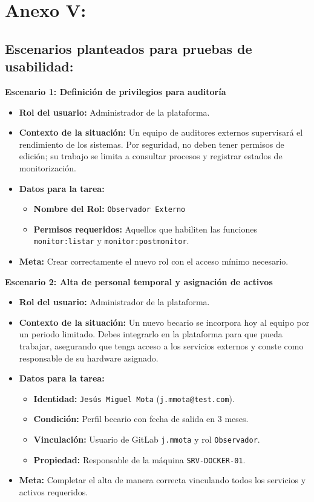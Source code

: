 \section{Anexo V:}
\subsection{Escenarios planteados para pruebas de usabilidad:}
\noindent\textbf{Escenario 1: Definición de privilegios para auditoría}
\begin{itemize}
    \item \textbf{Rol del usuario:} Administrador de la plataforma.
    \item \textbf{Contexto de la situación:} Un equipo de auditores externos supervisará el rendimiento de los sistemas. Por seguridad, no deben tener permisos de edición; su trabajo se limita a consultar procesos y registrar estados de monitorización.
    \item \textbf{Datos para la tarea:}
        \begin{itemize}
            \item \textbf{Nombre del Rol:} \texttt{Observador Externo}
            \item \textbf{Permisos requeridos:} Aquellos que habiliten las funciones \texttt{monitor:listar} y \texttt{monitor:postmonitor}.
        \end{itemize}
    \item \textbf{Meta:} Crear correctamente el nuevo rol con el acceso mínimo necesario.
\end{itemize}


\noindent\textbf{Escenario 2: Alta de personal temporal y asignación de activos}
\begin{itemize}
    \item \textbf{Rol del usuario:} Administrador de la plataforma.
    \item \textbf{Contexto de la situación:} Un nuevo becario se incorpora hoy al equipo por un periodo limitado. Debes integrarlo en la plataforma para que pueda trabajar, asegurando que tenga acceso a los servicios externos y conste como responsable de su hardware asignado.
    \item \textbf{Datos para la tarea:}
        \begin{itemize}
            \item \textbf{Identidad:} \texttt{Jesús Miguel Mota} (\texttt{j.mmota@test.com}).
            \item \textbf{Condición:} Perfil becario con fecha de salida en 3 meses.
            \item \textbf{Vinculación:} Usuario de GitLab \texttt{j.mmota} y rol \texttt{Observador}.
            \item \textbf{Propiedad:} Responsable de la máquina \texttt{SRV-DOCKER-01}.
        \end{itemize}
    \item \textbf{Meta:} Completar el alta de manera correcta vinculando todos los servicios y activos requeridos.
\end{itemize}

